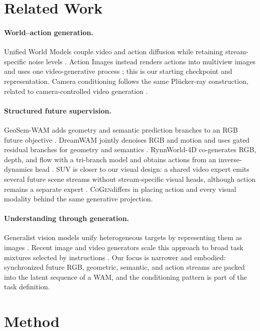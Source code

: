 \documentclass{article}
\newcommand{\method}{\textsc{CoGen}}
\begin{document}
\section{Related Work}

\paragraph{World--action generation.}
Unified World Models couple video and action diffusion while retaining stream-specific noise
levels \citep{zhu2025unified}. Action Images instead renders actions into multiview images and
uses one video-generative process \citep{zhen2026action}; this is our starting checkpoint and
representation. Camera conditioning follows the same Pl\"ucker-ray construction, related to
camera-controlled video generation \citep{sitzmann2021lfn,bai2025recammaster}.

\paragraph{Structured future supervision.}
GeoSem-WAM adds geometry and semantic prediction branches to an RGB future objective
\citep{ma2026geosem}. DreamWAM jointly denoises RGB and motion and uses gated residual branches
for geometry and semantics \citep{yuan2026dreamwam}. RynnWorld-4D co-generates RGB, depth, and
flow with a tri-branch model and obtains actions from an inverse-dynamics head
\citep{zhao2026rynnworld}. SUV is closer to our visual design: a shared video expert emits
several future scene streams without stream-specific visual heads, although action remains a
separate expert \citep{yuan2026suv}. \method differs in placing action and every visual
modality behind the same generative projection.

\paragraph{Understanding through generation.}
Generalist vision models unify heterogeneous targets by representing them as images
\citep{wang2023painter,zhuang2025argus}. Recent image and video generators scale this approach
to broad task mixtures selected by instructions \citep{gabeur2026image,wang2026video}. Our focus
is narrower and embodied: synchronized future RGB, geometric, semantic, and action streams are
packed into the latent sequence of a WAM, and the conditioning pattern is part of the task
definition.

\section{Method}
\label{sec:method}
\end{document}
